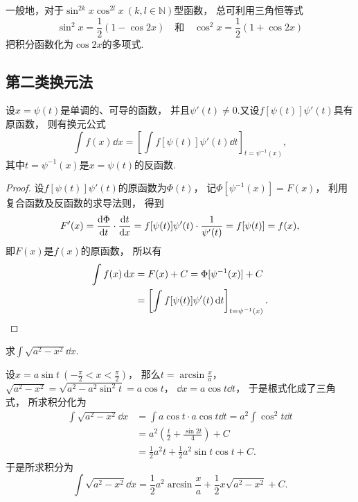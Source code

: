 \begin{remark}
一般地，对于\(\sin^{2k} x \cos^{2l} x\ (k,l\in\mathbb{N})\)型函数，
总可利用三角恒等式\[
	\sin^2 x = \frac{1}{2} (1 - \cos 2x)
	\quad\text{和}\quad
	\cos^2 x = \frac{1}{2} (1 + \cos 2x)
\]把积分函数化为\(\cos 2x\)的多项式.
\end{remark}

\subsection{第二类换元法}

\begin{theorem}
设\(x = \psi(t)\)是单调的、可导的函数，
并且\(\psi'(t) \neq 0\).又设\(f[\psi(t)] \psi'(t)\)具有原函数，
则有换元公式\[
	\int f(x) \dd{x} = \left[ \int f[\psi(t)] \psi'(t) \dd{t} \right]_{t=\psi^{-1}(x)},
\]
其中\(t=\psi^{-1}(x)\)是\(x=\psi(t)\)的反函数.
\begin{proof}
设\(f[\psi(t)] \psi'(t)\)的原函数为\(\Phi(t)\)，
记\(\Phi[\psi^{-1}(x)] = F(x)\)，
利用复合函数及反函数的求导法则，
得到\[
	F'(x) = \dv{\Phi}{t} \cdot \dv{t}{x}
	= f[\psi(t)] \psi'(t) \cdot \frac{1}{\psi'(t)}
	= f[\psi(t)] = f(x),
\]
即\(F(x)\)是\(f(x)\)的原函数，
所以有\begin{align*}
	\int f(x) \dd{x} &= F(x) + C
	= \Phi[\psi^{-1}(x)] + C \\
	&= \left[ \int f[\psi(t)] \psi'(t) \dd{t} \right]_{t=\psi^{-1}(x)}.
	\qedhere
\end{align*}
\end{proof}
\end{theorem}

\begin{example}
求\(\int \sqrt{a^2 - x^2} \dd{x}\).
\begin{solution}
设\(x = a \sin t\ (-\frac{\pi}{2} < x < \frac{\pi}{2})\)，
那么\(t = \arcsin\frac{x}{a}\)，
\(\sqrt{a^2 - x^2} = \sqrt{a^2 - a^2 \sin^2 t} = a \cos t\)，
\(\dd{x} = a \cos t \dd{t}\)，
于是根式化成了三角式，
所求积分化为\begin{align*}
	\int \sqrt{a^2 - x^2} \dd{x}
	&= \int a \cos t \cdot a \cos t \dd{t}
	= a^2 \int \cos^2 t \dd{t} \\
	&= a^2 \left( \frac{t}{2} + \frac{\sin 2t}{4} \right) + C \\
	&= \frac{1}{2} a^2 t + \frac{1}{2} a^2 \sin t \cos t + C.
\end{align*}
于是所求积分为\[
	\int \sqrt{a^2 - x^2} \dd{x}
	= \frac{1}{2} a^2 \arcsin\frac{x}{a} + \frac{1}{2} x \sqrt{a^2 - x^2} + C.
\]
\end{solution}
\end{example}

